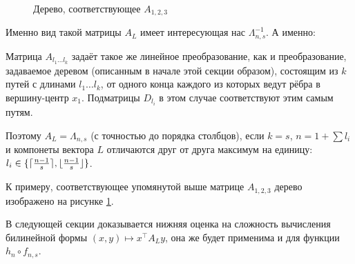 \documentclass[a4paper, 14pt]{extarticle}
\begin{document}
\begin{figure}[h]
\centering
{}
\caption{Дерево, соответствующее $A_{1, 2, 3}$}
\label{fig_last_tree}
\end{figure}

Именно вид такой матрицы $A_L$ имеет интересующая нас $\Lambda_{n, s}^{-1}$. А
именно:

\begin{remark}
Матрица $A_{l_1 \dots l_k}$ задаёт такое же линейное преобразование, как и
преобразование, задаваемое деревом (описанным в начале этой секции образом),
состоящим из $k$ путей с длинами $l_1 \dots l_k$, от одного конца каждого из
которых ведут рёбра в вершину-центр $x_1$. Подматрицы $D_{l_i}$ в этом случае
соответствуют этим самым путям.
\end{remark}

Поэтому $A_L = \Lambda_{n, s}$ (с точностью до порядка столбцов), если $k = s$,
$n = 1 + \sum l_i$ и компонеты вектора $L$ отличаются друг от друга максимум на
единицу: $l_i \in \{\lceil\frac {n-1} s\rceil, \lfloor\frac {n-1} s\rfloor\}$.

К примеру, соответствующее упомянутой выше матрице $A_{1,2,3}$ дерево изображено
на рисунке \ref{fig_last_tree}.

В следующей секции доказывается нижняя оценка на сложность вычисления билинейной
формы $(x, y) \mapsto x^\top A_L y$, она же будет применима и для функции $h_n
\circ f_{n, s}$.
\end{document}
